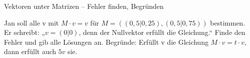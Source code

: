 \begin{aufgabe}{Vektoren unter Matrizen – Fehler finden, Begründen}
\begin{teile}
\teil Jan soll alle v mit $M \cdot v = v$ für $M = ((0{,}5 | 0{,}25), (0{,}5 | 0{,}75))$ bestimmen. Er schreibt: „$v = (0 | 0)$, denn der Nullvektor erfüllt die Gleichung.“ Finde den Fehler und gib alle Lösungen an.
\teil Begründe: Erfüllt v die Gleichung $M \cdot v = t \cdot v$, dann erfüllt auch $5v$ sie.
\end{teile}
\end{aufgabe}
